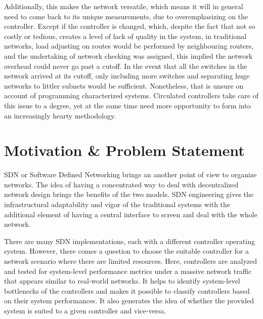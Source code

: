     Additionally, this makes the network versatile, which means it will in general need to come back to its unique measurements, due to overemphasizing on the controller. Except if the controller is changed, which, despite the fact that not so costly or tedious, creates a level of lack of quality in the system, in traditional networks, load adjusting on routes would be performed by neighbouring routers, and the undertaking of network checking was assigned, this implied the network overhead could never go past a cutoff. In the event that all the switches in the network arrived at its cutoff, only including more switches and separating huge networks to littler subnets would be sufficient. Nonetheless, that is unsure on account of programming characterized systems. Circulated controllers take care of this issue to a degree, yet at the same time need more opportunity to form into an increasingly hearty methodology.
    
    \section{Motivation \& Problem Statement}
    
    SDN or Software Defined Networking brings an another point of view to organize networks. The idea of having a concentrated way to deal with decentralized network design brings the benefits of the two models. SDN engineering gives the infrastructural adaptability and vigor of the traditional systems with the additional element of having a central interface to screen and deal with the whole network.
    
    There are many SDN implementations, each with a different controller operating system. However, there comes a question to choose the suitable controller for a network scenario where there are limited resources. Here, controllers are analyzed and tested for system-level performance metrics under a massive network traffic that appears similar to real-world networks. It helps to identify system-level bottlenecks of the controllers and makes it possible to classify controllers based on their system performances. It also generates the idea of whether the provided system is suited to a given controller and vice-versa.